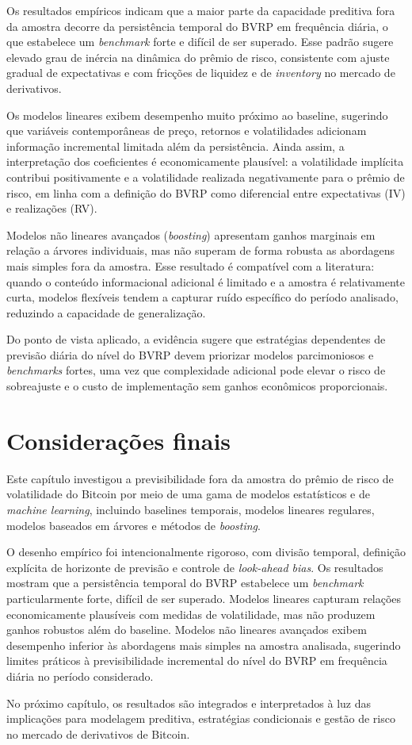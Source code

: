 Os resultados empíricos indicam que a maior parte da capacidade preditiva fora da
amostra decorre da persistência temporal do BVRP em frequência diária, o que
estabelece um \textit{benchmark} forte e difícil de ser superado. Esse padrão sugere
elevado grau de inércia na dinâmica do prêmio de risco, consistente com ajuste
gradual de expectativas e com fricções de liquidez e de \textit{inventory} no
mercado de derivativos.

Os modelos lineares exibem desempenho muito próximo ao baseline, sugerindo que
variáveis contemporâneas de preço, retornos e volatilidades adicionam informação
incremental limitada além da persistência. Ainda assim, a interpretação dos
coeficientes é economicamente plausível: a volatilidade implícita contribui
positivamente e a volatilidade realizada negativamente para o prêmio de risco, em
linha com a definição do BVRP como diferencial entre expectativas (IV) e
realizações (RV).

Modelos não lineares avançados (\textit{boosting}) apresentam ganhos marginais em
relação a árvores individuais, mas não superam de forma robusta as abordagens mais
simples fora da amostra. Esse resultado é compatível com a literatura: quando o
conteúdo informacional adicional é limitado e a amostra é relativamente curta,
modelos flexíveis tendem a capturar ruído específico do período analisado, reduzindo
a capacidade de generalização.

Do ponto de vista aplicado, a evidência sugere que estratégias dependentes de
previsão diária do nível do BVRP devem priorizar modelos parcimoniosos e
\textit{benchmarks} fortes, uma vez que complexidade adicional pode elevar o risco
de sobreajuste e o custo de implementação sem ganhos econômicos proporcionais.

\section{Considerações finais}
\label{sec:cap6_conclusion}

Este capítulo investigou a previsibilidade fora da amostra do prêmio de risco de
volatilidade do Bitcoin por meio de uma gama de modelos estatísticos e de
\textit{machine learning}, incluindo baselines temporais, modelos lineares
regulares, modelos baseados em árvores e métodos de \textit{boosting}.

O desenho empírico foi intencionalmente rigoroso, com divisão temporal, definição
explícita de horizonte de previsão e controle de \textit{look-ahead bias}. Os
resultados mostram que a persistência temporal do BVRP estabelece um
\textit{benchmark} particularmente forte, difícil de ser superado. Modelos lineares
capturam relações economicamente plausíveis com medidas de volatilidade, mas não
produzem ganhos robustos além do baseline. Modelos não lineares avançados exibem
desempenho inferior às abordagens mais simples na amostra analisada, sugerindo
limites práticos à previsibilidade incremental do nível do BVRP em frequência
diária no período considerado.

No próximo capítulo, os resultados são integrados e interpretados à luz das
implicações para modelagem preditiva, estratégias condicionais e gestão de risco
no mercado de derivativos de Bitcoin.
